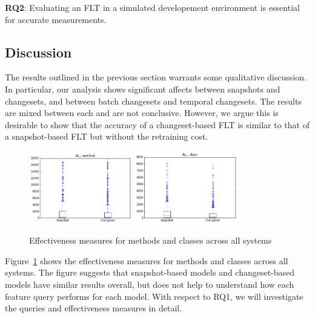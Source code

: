 \begin{framed}
    \textbf{RQ2}:
    Evaluating an FLT in a simulated developement environment is essential for
    accurate measurements.
\end{framed}



\subsection{Discussion}

The results outlined in the previous section warrants some qualitative
discussion.  In particular, our analysis shows significant affects between
snapshots and changesets, and between batch changesets and temporal changesets.
The results are mixed between each and are not conclusive.  However, we argue
this is desirable to show that the accuracy of a changeset-based FLT is similar
to that of a snapshot-based FLT but without the retraining cost.

\begin{figure}[t]
\centering
\includegraphics[width=0.4\textwidth]{figures/all_method}
\includegraphics[width=0.4\textwidth]{figures/all_class}
\caption{Effectiveness measures for methods and classes across all systems}
\label{fig:em}
\end{figure}

Figure~\ref{fig:em} shows the effectiveness measures for methods and classes
across all systems. The figure suggests that snapshot-based models and
changeset-based models have similar results overall, but does not help to
understand how each feature query performs for each model.
With respect to RQ1, we will investigate the queries and effectiveness measures in detail.

